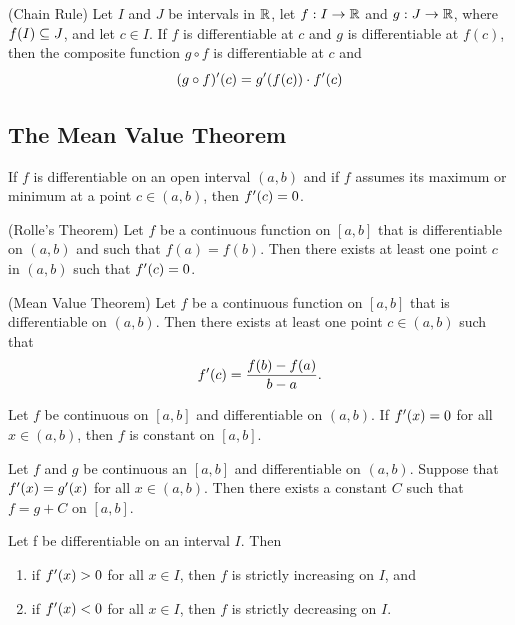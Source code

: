 \documentclass[12pt]{article}
\begin{document}
\begin{theorem}
(Chain Rule) Let $I$ and $J$ be intervals in $\mathbb{R}$, let $f : I \rightarrow \mathbb{R}$ and
$g : J \rightarrow \mathbb{R}$, where $f(I) \subseteq J$, and let $c \in I$. If $f$ is differentiable
at $c$ and $g$ is differentiable at $f(c)$, then the composite function $g \circ f$ is
differentiable at $c$ and $$(g \circ f)'(c) = g'(f(c)) \cdot f'(c)$$
\end{theorem}

\subsection{The Mean Value Theorem}
\label{sec:org586e70c}
\begin{theorem}
  If $f$ is differentiable on an open interval $(a,b)$ and if $f$ assumes its
  maximum or minimum at a point $c \in (a,b)$, then $f'(c) = 0$.
\end{theorem}

\begin{theorem}
  (Rolle's Theorem) Let $f$ be a continuous function on $[a,b]$ that is
  differentiable on $(a,b)$ and such that $f(a) = f(b)$. Then there exists at
  least one point $c$ in $(a,b)$ such that $f'(c) = 0$.
\end{theorem}

\begin{theorem}
  (Mean Value Theorem) Let $f$ be a continuous function on $[a,b]$ that is
  differentiable on $(a,b)$. Then there exists at least one point $c \in (a,b)$
  such that $$f'(c) = \frac{f(b) - f(a)}{b - a}.$$
\end{theorem}

\begin{theorem}
  Let $f$ be continuous on $[a,b]$ and differentiable on $(a,b)$. If $f'(x)
  = 0$ for all $x \in (a,b)$, then $f$ is constant on $[a,b]$.
\end{theorem}

\begin{corollary}
  Let $f$ and $g$ be continuous an $[a,b]$ and differentiable on $(a,b)$.
  Suppose that $f'(x) = g'(x)$ for all $x \in (a,b)$. Then there exists a
  constant $C$ such that $f = g + C$ on $[a,b]$.
\end{corollary}

\begin{theorem}
  Let f be differentiable on an interval $I$. Then 
  \begin{enumerate}
  \item if $f'(x) > 0$ for all $x \in I$, then $f$ is strictly increasing on
    $I$, and
  \item if $f'(x) < 0$ for all $x \in I$, then $f$ is strictly decreasing on
    $I$.
  \end{enumerate}
\end{theorem}
\end{document}
